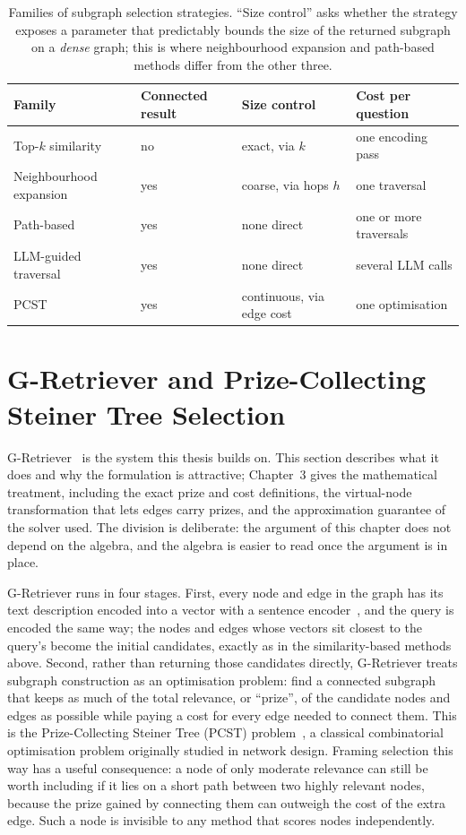 \begin{table}[t]
\centering
\caption{Families of subgraph selection strategies. ``Size control'' asks whether
the strategy exposes a parameter that predictably bounds the size of the returned
subgraph on a \emph{dense} graph; this is where neighbourhood expansion and
path-based methods differ from the other three.}
\label{tab:selection-families}
\begin{tabular}{llll}
\toprule
Family & Connected result & Size control & Cost per question \\
\midrule
Top-$k$ similarity      & no  & exact, via $k$            & one encoding pass \\
Neighbourhood expansion & yes & coarse, via hops $h$      & one traversal \\
Path-based              & yes & none direct               & one or more traversals \\
LLM-guided traversal    & yes & none direct               & several LLM calls \\
PCST                    & yes & continuous, via edge cost & one optimisation \\
\bottomrule
\end{tabular}
\end{table}

\section{G-Retriever and Prize-Collecting Steiner Tree Selection} \label{sec:gretriever-pcst}

G-Retriever~\cite{he2024gretriever} is the system this thesis builds on. This
section describes what it does and why the formulation is attractive; Chapter~3
gives the mathematical treatment, including the exact prize and cost definitions,
the virtual-node transformation that lets edges carry prizes, and the
approximation guarantee of the solver used. The division is deliberate: the
argument of this chapter does not depend on the algebra, and the algebra is
easier to read once the argument is in place.

G-Retriever runs in four stages. First, every node and edge in the graph has its
text description encoded into a vector with a sentence
encoder~\cite{reimers2019sentencebert}, and the query is encoded the same way;
the nodes and edges whose vectors sit closest to the query's become the initial
candidates, exactly as in the similarity-based methods above. Second, rather than
returning those candidates directly, G-Retriever treats subgraph construction as
an optimisation problem: find a connected subgraph that keeps as much of the
total relevance, or ``prize'', of the candidate nodes and edges as possible while
paying a cost for every edge needed to connect them. This is the
Prize-Collecting Steiner Tree (PCST) problem~\cite{bienstock1993pcst}, a
classical combinatorial optimisation problem originally studied in network
design. Framing selection this way has a useful consequence: a node of only
moderate relevance can still be worth including if it lies on a short path
between two highly relevant nodes, because the prize gained by connecting them
can outweigh the cost of the extra edge. Such a node is invisible to any method
that scores nodes independently.

